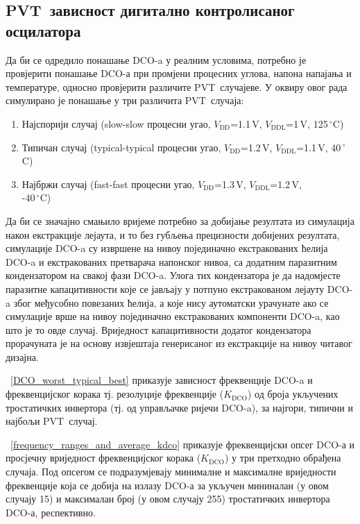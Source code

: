\documentclass[master]{finthesis}
\def \DCO  {DCO} %
\def \PVT  {PVT} %
\begin{document}
\subsection{\PVT\ зависност дигитално контролисаног осцилатора}
Да би се одредило понашање \DCO-a у реалним условима, потребно је провјерити понашање \DCO-а при промјени процесних углова, напона напајања и температуре, односно провјерити различите \PVT\ случајеве. У оквиру овог рада симулирано је понашање у три различита \PVT\ случаја:
\begin{enumerate}
	\item Најспорији случај (slow-slow процесни угао, $V_\text{DD}$=1.1\,V, $V_\text{DDL}$=1\,V, 125\,$^{\circ}$C)
	\item Типичан случај (typical-typical процесни угао, $V_\text{DD}$=1.2\,V, $V_\text{DDL}$=1.1\,V, 40\,$^{\circ}$C)
	\item Најбржи случај (fast-fast процесни угао, $V_\text{DD}$=1.3\,V, $V_\text{DDL}$=1.2\,V, \\ -40\,$^{\circ}$C)
\end{enumerate}
Да би се значајно смањило вријеме потребно за добијање резултата из симулација након екстракције лејаута, и то без губљења прецизности добијених резултата, симулације \DCO-a су извршене на нивоу појединачно екстракованих ћелија \DCO-a и екстракованих претварача напонског нивоа, са додатним паразитним кондензатором на свакој фази \DCO-a. Улога тих кондензатора је да надомјесте паразитне капацитивности које се јављају у потпуно екстракованом лејауту \DCO-a због међусобно повезаних ћелија, а које нису аутоматски урачунате ако се симулације врше на нивоу појединачно екстракованих компоненти \DCO-a, као што је то овде случај. Вриједност капацитивности додатог кондензатора прорачуната је на основу извјештаја генерисаног из екстракције на нивоу читавог дизајна. \par 
\figurename~\ref{DCO_worst_typical_best} приказује зависност фреквенције \DCO-a и фреквенцијског корака тј. резолуције фреквенције ($K_\text{DCO}$) од броја укључених тростатичких инвертора (тј. од управљачке ријечи \DCO-a), за најгори, типични и најбољи \PVT\ случај. 

\tablename~\ref{frequency_ranges_and_average_kdco} приказује фреквенцијски опсег \DCO-а и просјечну вриједност фреквенцијског корака ($K_\text{DCO}$) у три претходно обрађена случаја. Под опсегом се подразумјевају минималне и максималне вриједности фреквенције која се добија на излазу \DCO-а за укључен мининалан (у овом случају 15) и максималан број (у овом случају 255) тростатичких инвертора \DCO-а, респективно.
\end{document}
